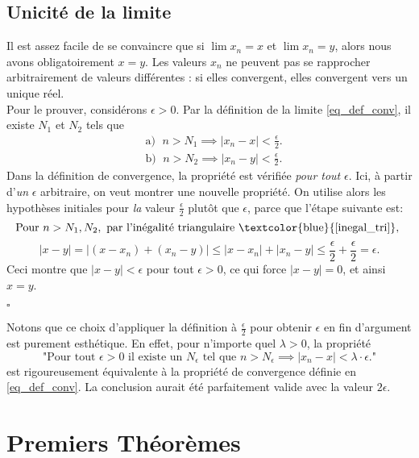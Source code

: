 \documentclass[oneside,11pt,french,table]{book}
\theoremstyle{definition}
\theoremstyle{plain}
\theoremstyle{remark}
\begin{document}
\subsection{Unicité de la limite}
Il est assez facile de se convaincre que si $\lim x_n = x$ et $\lim x_n=y$, alors nous avons obligatoirement $x=y$. Les valeurs $x_n$ ne peuvent pas se rapprocher arbitrairement de valeurs différentes : si elles convergent, elles convergent vers un unique réel. \\
Pour le prouver, considérons $\epsilon >0$. Par la définition de la limite 
\textcolor{blue}{\eqref{eq_def_conv}}, il existe $N_1$ et $N_2$ tels que
\begin{align*}
    &\text{a) } \; n>N_1 \implies |x_n-x|<\displaystyle\frac{\epsilon}{2}. \\
    &\text{b) } \; n>N_2 \implies |x_n-y|<\displaystyle\frac{\epsilon}{2}.
\end{align*}
Dans la définition de convergence, la propriété est vérifiée \textit{pour tout} $\epsilon$. Ici, à partir d'\textit{un} $\epsilon$ arbitraire, on veut montrer une nouvelle propriété. On utilise alors les hypothèses initiales pour \textit{la} valeur $\frac{\epsilon}{2}$ plutôt que $\epsilon$, parce que l'étape suivante est:
$$\text{Pour } n>N_1, N_2, \text{ par l'inégalité triangulaire \textcolor{blue}{\eqref{inegal_tri}}, }$$
$$|x-y|=|(x-x_n)+(x_n-y)| \leq |x-x_n|+|x_n-y|\leq \displaystyle\frac{\epsilon}{2} +  \displaystyle\frac{\epsilon}{2} = \epsilon.$$
Ceci montre que $|x-y|<\epsilon$ pour tout $\epsilon>0$, ce qui force $|x-y|=0$, et ainsi $x=y$. \begin{flushright}
$\square$
\end{flushright}
Notons que ce choix d'appliquer la définition à $\frac{\epsilon}{2}$ pour obtenir $\epsilon$ en fin d'argument est purement esthétique. En effet, pour n'importe quel $\lambda > 0$, la propriété
$$\text{"Pour tout } \epsilon > 0 \text { il existe un } N_\epsilon \text{ tel que } n > N_\epsilon \implies |x_n-x| < \lambda \cdot \epsilon \text{."}$$
est rigoureusement équivalente à la propriété de convergence définie en \textcolor{blue}{\eqref{eq_def_conv}}. La conclusion aurait été parfaitement valide avec la valeur $2\epsilon$.
\section{Premiers Théorèmes}
\end{document}
